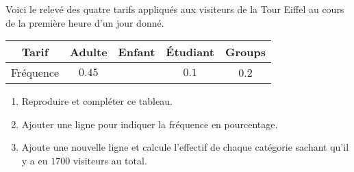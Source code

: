 
\begin{exercice}\label{exo2smath-0302}


Voici le relevé des quatre tarifs appliqués aux visiteurs de la Tour Eiffel au cours de la première heure d'un jour donné.

\begin{tabular}[]{|c|c|c|c|c|}
    \hline
    Tarif&Adulte&Enfant&Étudiant&Groups\\
    \hline
    Fréquence&\( 0.45\)&&\( 0.1\)&0.2\\
    \hline
\end{tabular}

\begin{enumerate}
    \item
        
 Reproduire et compléter ce tableau.
 \item
Ajouter une ligne pour indiquer la fréquence en pourcentage.
\item
 Ajoute une nouvelle ligne et calcule l'effectif de chaque catégorie sachant qu'il y a eu $1 700$ visiteurs au total.
\end{enumerate}

\end{exercice}
